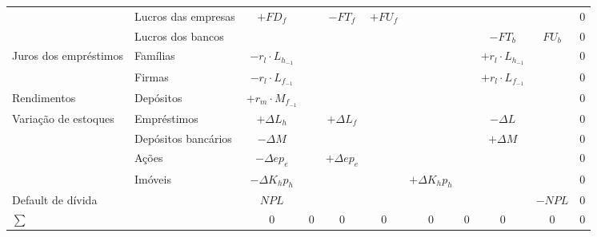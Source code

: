 \begin{landscape}
\begin{longtable}[c]{l|l|c|c|c|c|c|c|c|c|c|}
                                       & Lucros das empresas   & $+FD_f$                &               & $-FT_f$          & $+FU_f$  &                   &              &                        &         & $0$    \\ \cline{2-11} 
                                       & Lucros dos bancos     &                        &               &                  &          &                   &              & $-FT_b$                & $FU_b$  & $0$    \\ \cline{2-11} 
\multirow{2}{*}{Juros dos empréstimos} & Famílias              & $-r_l\cdot L_{h_{-1}}$ &               &                  &          &                   &              & $+r_l\cdot L_{h_{-1}}$ &         & $0$    \\ \cline{2-11} 
                                       & Firmas                & $-r_l\cdot L_{f_{-1}}$ &               &                  &          &                   &              & $+r_l\cdot L_{f_{-1}}$ &         & $0$    \\ \cline{2-11} 
Rendimentos                            & Depósitos             & $+r_m\cdot M_{f_{-1}}$ &               &                  &          &                   &              &                        &         & $0$    \\ \cline{2-11} 
\multirow{4}{*}{Variação de estoques}  & Empréstimos           & $+\Delta L_h$          &               & $+ \Delta L_f$   &          &                   &              & $-\Delta L$            &         & $0$    \\ \cline{2-11} 
                                       & Depósitos bancários   & $-\Delta M$            &               &                  &          &                   &              & $+\Delta M$            &         & $0$    \\ \cline{2-11} 
                                       & Ações                 & $-\Delta e p_e$        &               & $+\Delta e p_e$  &          &                   &              &                        &         & $0$    \\ \cline{2-11} 
                                       & Imóveis               & $-\Delta K_h p_h$      &               &                  &          & $+\Delta K_h p_h$ &              &                        &         & $0$    \\ \cline{2-11} 
Default de dívida                      &                       & $NPL$                  &               &                  &          &                   &              &                        & $-NPL$  & $0$    \\ \cline{2-11} 
$\sum$                                 &                       & $0$                    & $0$           & $0$              & $0$      & $0$               & $0$          & $0$                    & $0$     & $0$    \\ \cline{2-11} 
\end{longtable}
\end{landscape}

